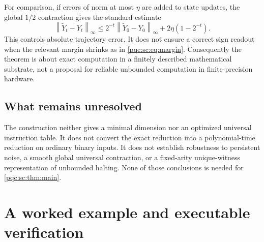 \documentclass[11pt,letterpaper]{article}
\numberwithin{equation}{section}
\theoremstyle{definition}
\theoremstyle{remark}
\newcommand{\norm}[1]{\left\lVert #1\right\rVert_{\infty}}
\newcommand{\srcmark}[1]{\par\noindent{\small\itshape [source~#1]}\par}
\begin{document}
For comparison, if errors of norm at most $\eta$ are added to state updates,
the global $1/2$ contraction gives the standard estimate
\[
 \norm{\widetilde Y_t-Y_t}
 \le 2^{-t}\norm{\widetilde Y_0-Y_0}+2\eta(1-2^{-t}).
\]
This controls absolute trajectory error. It does not ensure a correct
sign readout when the relevant margin shrinks as in \eqref{pqc:sc:eq:margin}.
Consequently the theorem is about exact computation in a finitely described
mathematical substrate, not a proposal for reliable unbounded computation
in finite-precision hardware.

\subsection{What remains unresolved}

The construction neither gives a minimal dimension nor an optimized
universal instruction table. It does not convert the exact reduction into
a polynomial-time reduction on ordinary binary inputs. It does not
establish robustness to persistent noise, a smooth global universal
contraction, or a fixed-arity unique-witness representation of unbounded
halting. None of those conclusions is needed for \cref{pqc:sc:thm:main}.

\section{A worked example and executable verification}\label{pqc:sc:sec:example}
\srcmark{14}
\end{document}
